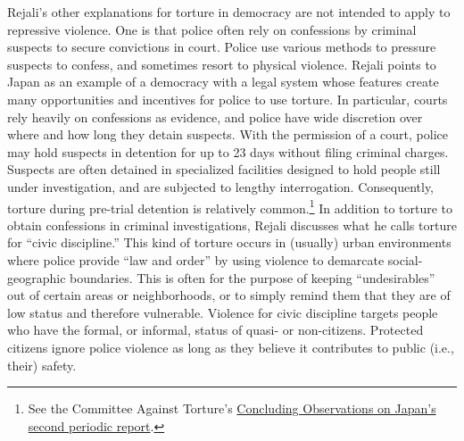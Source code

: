 \documentclass[11pt]{article}
\begin{document}
Rejali's other explanations for torture in democracy are not intended to apply to repressive violence. One is that police often rely on confessions by criminal suspects to secure convictions in court. Police use various methods to pressure suspects to confess, and sometimes resort to physical violence. Rejali points to Japan as an example of a democracy with a legal system whose features create many opportunities and incentives for police to use torture. In particular, courts rely heavily on confessions as evidence, and police have wide discretion over where and how long they detain suspects. With the permission of a court, police may hold suspects in detention for up to 23 days without filing criminal charges. Suspects are often detained in specialized facilities designed to hold people still under investigation, and are subjected to lengthy interrogation. Consequently, torture during pre-trial detention is relatively common.\footnote{See the Committee Against Torture's \href{https://www.refworld.org/publisher,CAT,,JPN,,,0.html}{Concluding Observations on Japan's second periodic report}.} In addition to torture to obtain confessions in criminal investigations, Rejali discusses what he calls torture for ``civic discipline.'' This kind of torture occurs in (usually) urban environments where police provide ``law and order'' by using violence to demarcate social-geographic boundaries. This is often for the purpose of keeping  ``undesirables'' out of certain areas or neighborhoods, or to simply remind them that they are of low status and therefore vulnerable. Violence for civic discipline targets people who have the formal, or informal, status of quasi- or non-citizens. Protected citizens ignore police violence as long as they believe it contributes to public (i.e., their) safety. 
\end{document}

